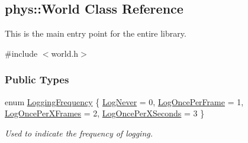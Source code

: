 \hypertarget{classphys_1_1World}{
\subsection{phys::World Class Reference}
\label{classphys_1_1World}
}


This is the main entry point for the entire library.  




{\ttfamily \#include $<$world.h$>$}

\subsubsection*{Public Types}
\begin{DoxyCompactItemize}
\item 
enum \hyperlink{classphys_1_1World_a8c754464edbb78270fa0ee1e395b963d}{LoggingFrequency} \{ \hyperlink{classphys_1_1World_a8c754464edbb78270fa0ee1e395b963da477724952d47abb95e5addd925fc2ec6}{LogNever} =  0, 
\hyperlink{classphys_1_1World_a8c754464edbb78270fa0ee1e395b963dafce667b90c7842e6452d09f4954b6fe7}{LogOncePerFrame} =  1, 
\hyperlink{classphys_1_1World_a8c754464edbb78270fa0ee1e395b963da017fb8da8ff480a3b3190c96cdddde74}{LogOncePerXFrames} =  2, 
\hyperlink{classphys_1_1World_a8c754464edbb78270fa0ee1e395b963da5acb020cb6b0f759ecd25c413927be55}{LogOncePerXSeconds} =  3
 \}
\begin{DoxyCompactList}\small\item\em Used to indicate the frequency of logging. \item\end{DoxyCompactList}\end{DoxyCompactItemize}
